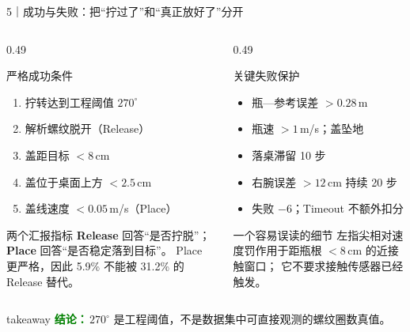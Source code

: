 \documentclass[aspectratio=169,10pt]{ctexbeamer}
\newcommand{\takeaway}[1]{%
  \begin{beamercolorbox}[wd=\textwidth,rounded=true,sep=0.55ex]{takeaway}
    \footnotesize\textcolor{Green}{\bfseries 结论：}\,#1
  \end{beamercolorbox}}
\begin{document}
\begin{frame}[t]{5｜成功与失败：把“拧过了”和“真正放好了”分开}
  \begin{columns}[T,onlytextwidth]
    \begin{column}{0.49\textwidth}
      \begin{block}{严格成功条件}
        \begin{enumerate}
          \item 拧转达到工程阈值 $270^\circ$
          \item 解析螺纹脱开（Release）
          \item 盖距目标 $<8$\,cm
          \item 盖位于桌面上方 $<2.5$\,cm
          \item 盖线速度 $<0.05$\,m/s（Place）
        \end{enumerate}
      \end{block}

      \begin{block}{两个汇报指标}
        \textbf{Release} 回答“是否拧脱”；\textbf{Place} 回答“是否稳定落到目标”。
        Place 更严格，因此 5.9\% 不能被 31.2\% 的 Release 替代。
      \end{block}
    \end{column}

    \begin{column}{0.49\textwidth}
      \begin{alertblock}{关键失败保护}
        \begin{itemize}
          \item 瓶—参考误差 $>0.28$\,m
          \item 瓶速 $>1$\,m/s；盖坠地
          \item 落桌滞留 10 步
          \item 右腕误差 $>12$\,cm 持续 20 步
          \item 失败 $-6$；Timeout 不额外扣分
        \end{itemize}
      \end{alertblock}

      \begin{block}{一个容易误读的细节}
        左指尖相对速度罚作用于距瓶根 $<8$\,cm 的近接触窗口；
        它不要求接触传感器已经触发。
      \end{block}
    \end{column}
  \end{columns}

  \takeaway{$270^\circ$ 是工程阈值，不是数据集中可直接观测的螺纹圈数真值。}
\end{frame}
\end{document}

